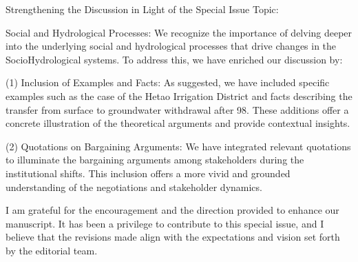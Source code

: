 \AR{} Strengthening the Discussion in Light of the Special Issue Topic:

\AR*{} Social and Hydrological Processes: We recognize the importance of delving deeper into the underlying social and hydrological processes that drive changes in the SocioHydrological systems. To address this, we have enriched our discussion by:

\AR*{} (1) Inclusion of Examples and Facts: As suggested, we have included specific examples such as the case of the Hetao Irrigation District and facts describing the transfer from surface to groundwater withdrawal after 98. These additions offer a concrete illustration of the theoretical arguments and provide contextual insights.

\AR*{} (2) Quotations on Bargaining Arguments: We have integrated relevant quotations to illuminate the bargaining arguments among stakeholders during the institutional shifts. This inclusion offers a more vivid and grounded understanding of the negotiations and stakeholder dynamics.

\AR{} I am grateful for the encouragement and the direction provided to enhance our manuscript. It has been a privilege to contribute to this special issue, and I believe that the revisions made align with the expectations and vision set forth by the editorial team.
